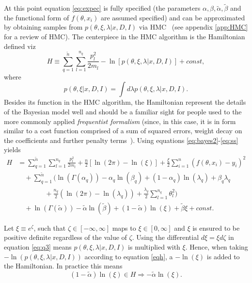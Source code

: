 At this point equation \eqref{eq:expec} is fully specified (the parameters $\alpha,\beta,\tilde{\alpha},\tilde{\beta}$ and the functional form of $f(\theta,x_i)$ are assumed specified) and can be approximated by obtaining samples from $p(\theta,\xi,\lambda|x,D,I)$ via HMC~\citep{Hammersley1964,Duane:1987de,Neal:1996,Neal2012} (see appendix \ref{app:HMC} for a review of HMC). The centerpiece in the HMC algorithm is the Hamiltonian defined viz~\citep{Neal:1996,Neal2012}
\begin{equation}
	H \equiv  \sum_{q=1}^{\tilde{n}}\sum_{l=1}^{n_q}\frac{p_{l}^2}{2m_{l}}-\ln[p(\theta,\xi,\lambda|x,D,I)]+const,
	\label{eqh}
\end{equation}
where 
\begin{equation}
	p(\theta,\xi|x,D,I) = \int d\lambda p(\theta,\xi,\lambda|x,D,I).
	\label{eq:ss}
\end{equation}
Besides its function in the HMC algorithm, the Hamiltonian represent the details of the Bayesian model well and should be a familiar sight for people used to the more commonly applied \emph{frequentist formalism} (since, in this case, it is in form similar to a cost function comprised of a sum of squared errors, weight decay on the coefficients and further penalty terms~\citep{hastie_09,murphy2013machine,Goodfellow2016}). Using equations \eqref{eq:bayes2}-\eqref{eq:ss} yields
\begin{equation}
	\begin{split}
		H&=\sum_{q=1}^{\tilde{n}}\sum_{l=1}^{n_q}\frac{p_{l}^2}{2m_{l}}+\frac{n}{2}[\ln(2\pi)-\ln(\xi)] +\frac{\xi}{2}\sum_{i=1}^{n}(f(\theta,x_i)-y_i)^2\\
		&\quad+\sum_{q=1}^{\tilde{n}}\bigg(\ln(\Gamma(\alpha_q))-\alpha_q\ln(\beta_q)+(1-\alpha_q)\ln(\lambda_q)+\beta_q\lambda_q\\
		&\qquad\qquad+\frac{n_q}{2}(\ln(2\pi)-\ln(\lambda_q))+\frac{\lambda_q}{2}\sum_{l=1}^{n_q}\theta_l^2\bigg)\\
		&\quad+\ln(\Gamma(\tilde{\alpha}))-\tilde{\alpha}\ln(\tilde{\beta})+(1-\tilde{\alpha})\ln(\xi)+\tilde{\beta}\xi+const.
	\end{split}
	\label{eqh2}
\end{equation}

\begin{example}
	Let $\xi \equiv e^\zeta$, such that $\zeta\in [-\infty,\infty]$ maps to $\xi\in[0,\infty]$ and $\xi$ is ensured to be positive definite regardless of the value of $\zeta$. Using the differential $d\xi =  \xi d\zeta$ in equation \eqref{eq:q3} means $p(\theta,\xi,\lambda|x,D,I)$ is multiplied with $\xi$. Hence, when taking $-\ln(p(\theta,\xi,\lambda|x,D,I))$ according to equation \eqref{eqh}, a $-\ln(\xi)$ is added to the Hamiltonian. In practice this means
	\begin{equation}
		(1-\tilde{\alpha})\ln(\xi)\in H\Rightarrow -\tilde{\alpha}\ln(\xi).
	\end{equation} 	
\end{example}

